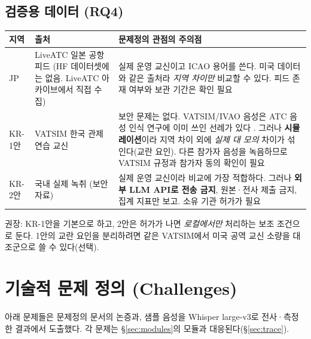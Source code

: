 \documentclass[10pt,a4paper]{article}
\begin{document}
\subsection{검증용 데이터 (RQ4)}
\begin{center}\small
\begin{tabularx}{\textwidth}{@{}l>{\raggedright\arraybackslash}p{3.5cm}>{\raggedright\arraybackslash}X@{}}
\toprule
지역 & 출처 & 문제정의 관점의 주의점\\\midrule
JP & LiveATC 일본 공항 피드 (HF 데이터셋에는 없음. LiveATC 아카이브에서 직접 수집) & 실제 운영 교신이고 ICAO 용어를 쓴다. 미국 데이터와 같은 출처라 \emph{지역 차이만} 비교할 수 있다. 피드 존재 여부와 보관 기간은 확인 필요\\
KR-1안 & VATSIM 한국 관제 연습 교신 & 보안 문제는 없다. VATSIM/IVAO 음성은 ATC 음성 인식 연구에 이미 쓰인 선례가 있다 \cite{youtubeatc}. 그러나 \textbf{시뮬레이션}이라 지역 차이 외에 \emph{실제 대 모의} 차이가 섞인다(교란 요인). 다른 참가자 음성을 녹음하므로 VATSIM 규정과 참가자 동의 확인이 필요\\
KR-2안 & 국내 실제 녹취 (보안 자료) & 실제 운영 교신이라 비교에 가장 적합하다. 그러나 \textbf{외부 LLM API로 전송 금지}, 원본·전사 제출 금지, 집계 지표만 보고. 소유 기관 허가가 필요\\
\bottomrule
\end{tabularx}
\end{center}
권장: KR-1안을 기본으로 하고, 2안은 허가가 나면 \emph{로컬에서만} 처리하는 보조 조건으로 둔다. 1안의 교란 요인을 분리하려면 같은 VATSIM에서 미국 공역 교신 소량을 대조군으로 쓸 수 있다(선택).

\section{기술적 문제 정의 (Challenges)}\label{sec:challenges}
아래 문제들은 문제정의 문서의 논증과, 샘플 음성을 Whisper large-v3로 전사·측정한 결과에서 도출했다.
각 문제는 \S\ref{sec:modules}의 모듈과 대응된다(\S\ref{sec:trace}).
\end{document}
